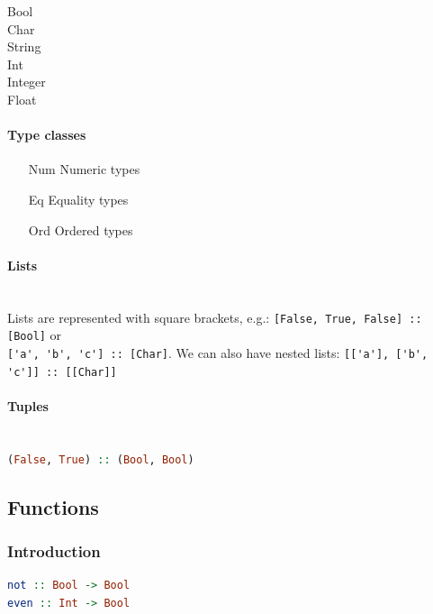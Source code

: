 \begin{description}
	\item[Bool] 
	\item[Char]
	\item[String]
	\item[Int]
	\item[Integer]
	\item[Float]
\end{description}

\paragraph{Type classes}

\begin{itemize}
	\item[Num] Numeric types
	\item[Eq] Equality types
	\item[Ord] Ordered types
\end{itemize}

\paragraph{Lists} \hfill \\

Lists are represented with square brackets, e.g.: \lstinline|[False, True, False] :: [Bool]| or \hfill \\ \lstinline|['a', 'b', 'c'] :: [Char]|. We can also have nested lists: \lstinline|[['a'], ['b', 'c']] :: [[Char]]|

\paragraph{Tuples} \hfill \\

\lstinline[language=Haskell]|(False, True) :: (Bool, Bool)|


\subsection{Functions}

\subsubsection{Introduction}

\begin{lstlisting}[language=Haskell]
not :: Bool -> Bool
even :: Int -> Bool
\end{lstlisting}

